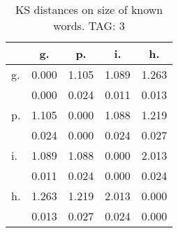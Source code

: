 \begin{table}[h!]
\begin{center}
\begin{tabular}{| l | c | c | c | c |}\hline
 & g. & p. & i. & h. \\\hline
g. & 0.000  & 1.105  & 1.089  & 1.263 \\\hline
 & 0.000  & 0.024  & 0.011  & 0.013 \\\hline
p. & 1.105  & 0.000  & 1.088  & 1.219 \\\hline
 & 0.024  & 0.000  & 0.024  & 0.027 \\\hline
i. & 1.089  & 1.088  & 0.000  & 2.013 \\\hline
 & 0.011  & 0.024  & 0.000  & 0.024 \\\hline
h. & 1.263  & 1.219  & 2.013  & 0.000 \\\hline
 & 0.013  & 0.027  & 0.024  & 0.000 \\\hline
\end{tabular}
\caption{KS distances on size of known words. TAG: 3}
\end{center}
\end{table}